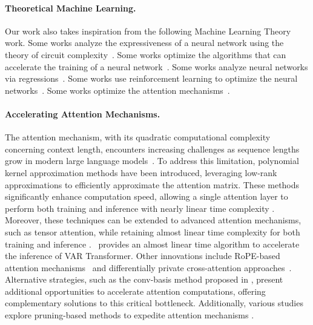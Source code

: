 \paragraph{Theoretical Machine Learning.}
Our work also takes inspiration from the following Machine Learning Theory work. Some works analyze the expressiveness of a neural network using the theory of circuit complexity~\cite{lls+25_gnn,kll+25_var_tc0,lls+24_rope_tensor_tc0,cll+24_mamba,cll+24_rope}. Some works optimize the algorithms that can accelerate the training of a neural network~\cite{llsz24,klsz24,dlms24,dswy22_coreset,haochen3,haochen4,dms23_spar,cll+25_deskreject,sy23,swyy23,lss+22,lsx+22,hst+22,hsw+22,hst+20,bsy23,dsy23,syyz23_weighted,gsy23_coin,gsy23_hyper,gsyz23,gswy23,syzz24,lsw+24,lsxy24,hsk+24,hlsl24}. Some works analyze neural networks via regressions~\cite{cll+24_icl,gms23,lsz23_exp,gsx23,ssz23_tradeoff,css+23,syyz23_ellinf,syz23,swy23,syz23_quantum,lls+25_grok}. Some works use reinforcement learning to optimize the neural networks~\cite{haochen1,haochen2,yunfan1,yunfan2,yunfan3,yunfan4,lswy23}. Some works optimize the attention mechanisms~\cite{sxy23,lls+24_conv}.


\paragraph{Accelerating Attention Mechanisms.}
The attention mechanism, with its quadratic computational complexity concerning context length, encounters increasing challenges as sequence lengths grow in modern large language models~\cite{gpto1,llama3_blog,claude3_pdf}. To address this limitation, polynomial kernel approximation methods \citep{aa22} have been introduced, leveraging low-rank approximations to efficiently approximate the attention matrix. These methods significantly enhance computation speed, allowing a single attention layer to perform both training and inference with nearly linear time complexity \citep{as23, as24b}. Moreover, these techniques can be extended to advanced attention mechanisms, such as tensor attention, while retaining almost linear time complexity for both training and inference \cite{as24_iclr}.~\cite{kll+25} provides an almost linear time algorithm to accelerate the inference of VAR Transformer. Other innovations include RoPE-based attention mechanisms~\cite{as24_rope,chl+24_rope} and differentially private cross-attention approaches~\cite{lssz24_dp}. Alternative strategies, such as the conv-basis method proposed in \cite{lls+24_conv}, present additional opportunities to accelerate attention computations, offering complementary solutions to this critical bottleneck. Additionally, various studies explore pruning-based methods to expedite attention mechanisms \cite{lls+24_prune,cls+24,llss24_sparse,ssz+25_prune,ssz+25_dit,hyw+23,whl+24,xhh+24,ssz+25_prune}.


